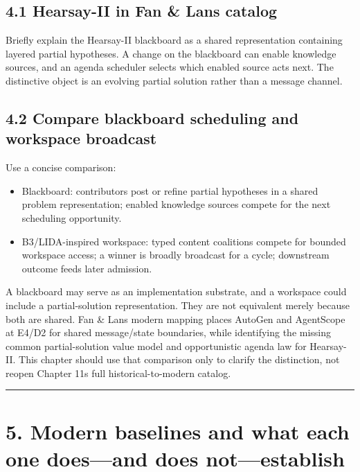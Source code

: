 \subsection{4.1 Hearsay-II in Fan \& Lan\textquotesingle s catalog}\label{41-hearsay-ii-in-fan--lans-catalog}

Briefly explain the Hearsay-II blackboard as a shared representation containing layered partial hypotheses. A change on the blackboard can enable knowledge sources, and an agenda scheduler selects which enabled source acts next. The distinctive object is an evolving partial solution rather than a message channel.

\subsection{4.2 Compare blackboard scheduling and workspace broadcast}\label{42-compare-blackboard-scheduling-and-workspace-broadcast}

Use a concise comparison:

\begin{itemize}
\tightlist
\item
  Blackboard: contributors post or refine partial hypotheses in a shared problem representation; enabled knowledge sources compete for the next scheduling opportunity.
\item
  B3/LIDA-inspired workspace: typed content coalitions compete for bounded workspace access; a winner is broadly broadcast for a cycle; downstream outcome feeds later admission.
\end{itemize}

A blackboard may serve as an implementation substrate, and a workspace could include a partial-solution representation. They are not equivalent merely because both are shared. Fan \& Lan\textquotesingle s modern mapping places AutoGen and AgentScope at E4/D2 for shared message/state boundaries, while identifying the missing common partial-solution value model and opportunistic agenda law for Hearsay-II. This chapter should use that comparison only to clarify the distinction, not reopen Chapter 11\textquotesingle s full historical-to-modern catalog.

\begin{center}\rule{0.5\linewidth}{0.5pt}\end{center}

\section{5. Modern baselines and what each one does---and does not---establish}\label{5-modern-baselines-and-what-each-one-doesand-does-notestablish}

